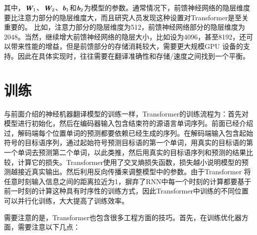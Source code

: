 \noindent 其中，$\textbf{\em W}_1$、$\textbf{\em W}_2$、$\textbf{\em b}_1$和$\textbf{\em b}_2$为模型的参数。通常情况下，前馈神经网络的隐层维度要比注意力部分的隐层维度大，而且研究人员发现这种设置对Transformer是至关重要的。 比如，注意力部分的隐层维度为512，前馈神经网络部分的隐层维度为2048。当然，继续增大前馈神经网络的隐层大小，比如设为4096，甚至8192，还可以带来性能的增益，但是前馈部分的存储消耗较大，需要更大规模GPU 设备的支持。因此在具体实现时，往往需要在翻译准确性和存储/速度之间找到一个平衡。

\sectionnewpage
\section{训练}

\parinterval 与前面介绍的神经机器翻译模型的训练一样，Transformer的训练流程为：首先对模型进行初始化，然后在编码器输入包含结束符的源语言单词序列。前面已经介绍过，解码端每个位置单词的预测都要依赖已经生成的序列。在解码端输入包含起始符号的目标语序列，通过起始符号预测目标语的第一个单词，用真实的目标语的第一个单词去预测第二个单词，以此类推，然后用真实的目标语序列和预测的结果比较，计算它的损失。Transformer使用了交叉熵损失函数，损失越小说明模型的预测越接近真实输出。然后利用反向传播来调整模型中的参数。由于Transformer 将任意时刻输入信息之间的距离拉近为1，摒弃了RNN中每一个时刻的计算都要基于前一时刻的计算这种具有时序性的训练方式，因此Transformer中训练的不同位置可以并行化训练，大大提高了训练效率。

%

\parinterval 需要注意的是，Transformer也包含很多工程方面的技巧。首先，在训练优化器方面，需要注意以下几点：

